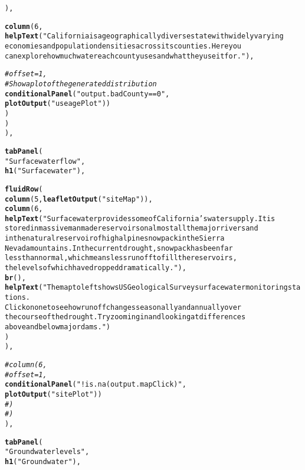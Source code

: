\documentclass[english]{article}\usepackage[]{graphicx}\usepackage[]{color}
\makeatletter
\newcommand{\hlnum}[1]{\textcolor[rgb]{0.686,0.059,0.569}{#1}}%
\newcommand{\hlstr}[1]{\textcolor[rgb]{0.192,0.494,0.8}{#1}}%
\newcommand{\hlcom}[1]{\textcolor[rgb]{0.678,0.584,0.686}{\textit{#1}}}%
\newcommand{\hlstd}[1]{\textcolor[rgb]{0.345,0.345,0.345}{#1}}%
\newcommand{\hlkwd}[1]{\textcolor[rgb]{0.737,0.353,0.396}{\textbf{#1}}}%
\newenvironment{kframe}{%
 \def\at@end@of@kframe{}%
 \ifinner\ifhmode%
  \def\at@end@of@kframe{\end{minipage}}%
  \begin{minipage}{\columnwidth}%
 \fi\fi%
 \def\FrameCommand##1{\hskip\@totalleftmargin \hskip-\fboxsep
 \colorbox{shadecolor}{##1}\hskip-\fboxsep
     \hskip-\linewidth \hskip-\@totalleftmargin \hskip\columnwidth}%
 \MakeFramed {\advance\hsize-\width
   \@totalleftmargin\z@ \linewidth\hsize
   \@setminipage}}%
 {\par\unskip\endMakeFramed%
 \at@end@of@kframe}
\newenvironment{knitrout}{}{} %
\makeatother
\begin{document}
\begin{knitrout}
\begin{kframe}
\begin{alltt}
        \hlstd{),}

        \hlkwd{column}\hlstd{(}\hlnum{6}\hlstd{,}
               \hlkwd{helpText}\hlstd{(}\hlstr{"California is a geographically diverse state with widely varying 
                economies and population densities across its counties. Here you 
                can explore how much water each county uses and what they use it for."}\hlstd{),}

               \hlcom{# offset = 1,}
               \hlcom{# Show a plot of the generated distribution}
               \hlkwd{conditionalPanel}\hlstd{(}\hlstr{"output.badCounty == 0"}\hlstd{,}
                                \hlkwd{plotOutput}\hlstd{(}\hlstr{"useagePlot"}\hlstd{))}
        \hlstd{)}
      \hlstd{)}
    \hlstd{),}

    \hlkwd{tabPanel}\hlstd{(}
      \hlstr{"Surface water flow"}\hlstd{,}
      \hlkwd{h1}\hlstd{(}\hlstr{"Surface water"}\hlstd{),}

      \hlkwd{fluidRow}\hlstd{(}
        \hlkwd{column}\hlstd{(}\hlnum{5}\hlstd{,} \hlkwd{leafletOutput}\hlstd{(}\hlstr{"siteMap"}\hlstd{)),}
        \hlkwd{column}\hlstd{(}\hlnum{6}\hlstd{,}
               \hlkwd{helpText}\hlstd{(}\hlstr{"Surface water provides some of California's water supply. It is 
               stored in massive manmade reservoirs on almost all the major rivers and
               in the natural reservoir of high alpine snowpack in the Sierra
               Nevada mountains. In the current drought, snowpack has been far 
               less than normal, which means less runoff to fill the reservoirs, 
               the levels of which have dropped dramatically."}\hlstd{),}
               \hlkwd{br}\hlstd{(),}
               \hlkwd{helpText}\hlstd{(}\hlstr{"The map to left shows US Geological Survey surface water monitoring stations.
               Click on one to see how runoff changes seasonally and annually over
               the course of the drought. Try zooming in and looking at differences
               above and below major dams."}\hlstd{)}
        \hlstd{)}
      \hlstd{),}

      \hlcom{#        column(6, }
      \hlcom{#               offset = 1,}
      \hlkwd{conditionalPanel}\hlstd{(}\hlstr{"!is.na(output.mapClick)"}\hlstd{,}
                       \hlkwd{plotOutput}\hlstd{(}\hlstr{"sitePlot"}\hlstd{))}
      \hlcom{#        )}
      \hlcom{#      )}
    \hlstd{),}

    \hlkwd{tabPanel}\hlstd{(}
      \hlstr{"Groundwater levels"}\hlstd{,}
      \hlkwd{h1}\hlstd{(}\hlstr{"Groundwater"}\hlstd{),}


\end{alltt}
\end{kframe}
\end{knitrout}
\end{document}

